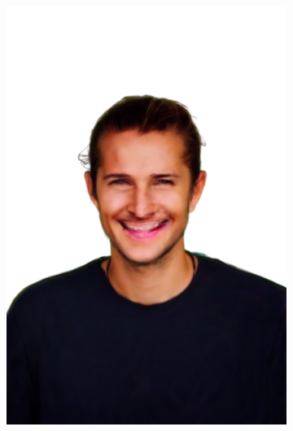 \begin{figure}[ht]
	\centering
	\begin{subfigure}{0.2\linewidth}
		\includegraphics[width=\textwidth]{Figures/failed/smile/2_render-removebg-preview.png}
	\end{subfigure}
	\begin{subfigure}{0.2\linewidth}

\end{subfigure}
\end{figure}

